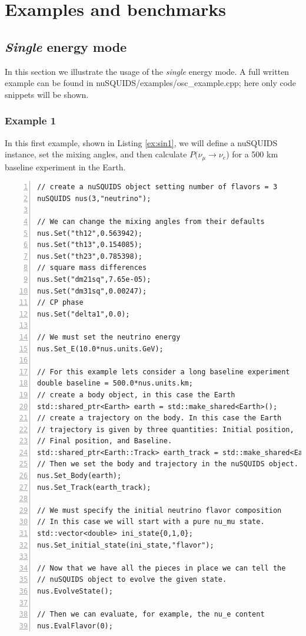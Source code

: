 \documentclass[3p,12pt]{elsarticle}
\newcommand{\ttf}{\ttfamily}
\begin{document}







\section{Examples and benchmarks} 
\label{sec:examples} 

\subsection{{\it Single} energy mode}

In this section we illustrate the usage of the {\it single} energy mode. A full written example can be found in {\ttf nuSQUIDS/examples/osc\_example.cpp}; here only code snippets will be shown.

\subsubsection{Example 1}

In this first example, shown in Listing \ref{ex:sin1}, we will define a {\ttf nuSQUIDS} instance, set the mixing angles, and then calculate $P(\nu_\mu \to \nu_e$) for a 500 km baseline experiment in the Earth.

\begin{lstlisting}[frame=leftline, numbers = left,breaklines=true, label = ex:sin1]
// create a nuSQUIDS object setting number of flavors = 3
nuSQUIDS nus(3,"neutrino");

// We can change the mixing angles from their defaults
nus.Set("th12",0.563942);
nus.Set("th13",0.154085);
nus.Set("th23",0.785398);
// square mass differences
nus.Set("dm21sq",7.65e-05);
nus.Set("dm31sq",0.00247);
// CP phase
nus.Set("delta1",0.0);

// We must set the neutrino energy
nus.Set_E(10.0*nus.units.GeV);

// For this example lets consider a long baseline experiment
double baseline = 500.0*nus.units.km;
// create a body object, in this case the Earth
std::shared_ptr<Earth> earth = std::make_shared<Earth>();
// create a trajectory on the body. In this case the Earth
// trajectory is given by three quantities: Initial position,
// Final position, and Baseline.
std::shared_ptr<Earth::Track> earth_track = std::make_shared<Earth::Track>(0.0,baseline,baseline);
// Then we set the body and trajectory in the nuSQUIDS object.
nus.Set_Body(earth);
nus.Set_Track(earth_track);

// We must specify the initial neutrino flavor composition
// In this case we will start with a pure nu_mu state.
std::vector<double> ini_state{0,1,0};
nus.Set_initial_state(ini_state,"flavor");

// Now that we have all the pieces in place we can tell the
// nuSQUIDS object to evolve the given state.
nus.EvolveState();

// Then we can evaluate, for example, the nu_e content
nus.EvalFlavor(0);

\end{lstlisting}
\end{document}
